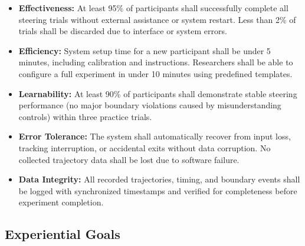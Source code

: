 \documentclass[sigconf]{acmart}
\begin{document}
\begin{itemize}

\item \textbf{Effectiveness:}
At least 95\% of participants shall successfully complete all steering trials without external assistance or system restart. Less than 2\% of trials shall be discarded due to interface or system errors.

\item \textbf{Efficiency:}
System setup time for a new participant shall be under 5 minutes, including calibration and instructions. Researchers shall be able to configure a full experiment in under 10 minutes using predefined templates.

\item \textbf{Learnability:}
At least 90\% of participants shall demonstrate stable steering performance (no major boundary violations caused by misunderstanding controls) within three practice trials.

\item \textbf{Error Tolerance:}
The system shall automatically recover from input loss, tracking interruption, or accidental exits without data corruption. No collected trajectory data shall be lost due to software failure.

\item \textbf{Data Integrity:}
All recorded trajectories, timing, and boundary events shall be logged with synchronized timestamps and verified for completeness before experiment completion.

\end{itemize}

\subsection{Experiential Goals}
\end{document}
